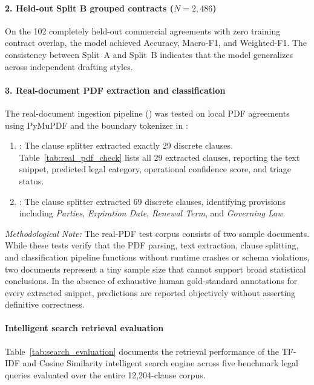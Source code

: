 \paragraph*{2. Held-out Split B grouped contracts ($N = 2,486$)}
On the 102 completely held-out commercial agreements with zero training contract overlap, the model achieved \FinalSplitBAcc{} Accuracy, \FinalSplitBMacroFScore{} Macro-F1, and \FinalSplitBWeightedFScore{} Weighted-F1. The consistency between Split~A and Split~B indicates that the model generalizes across independent drafting styles.

\paragraph*{3. Real-document PDF extraction and classification}
The real-document ingestion pipeline () was tested on local PDF agreements using PyMuPDF and the boundary tokenizer in :
\begin{enumerate}
    \item {}: The clause splitter extracted exactly 29 discrete clauses. Table~\ref{tab:real_pdf_check} lists all 29 extracted clauses, reporting the text snippet, predicted legal category, operational confidence score, and triage status.
    \item {}: The clause splitter extracted 69 discrete clauses, identifying provisions including \textit{Parties}, \textit{Expiration Date}, \textit{Renewal Term}, and \textit{Governing Law}.
\end{enumerate}



\textit{Methodological Note:} The real-PDF test corpus consists of two sample documents. While these tests verify that the PDF parsing, text extraction, clause splitting, and classification pipeline functions without runtime crashes or schema violations, two documents represent a tiny sample size that cannot support broad statistical conclusions. In the absence of exhaustive human gold-standard annotations for every extracted snippet, predictions are reported objectively without asserting definitive correctness.

\paragraph*{Intelligent search retrieval evaluation}
Table~\ref{tab:search_evaluation} documents the retrieval performance of the TF-IDF and Cosine Similarity intelligent search engine across five benchmark legal queries evaluated over the entire 12,204-clause corpus.

